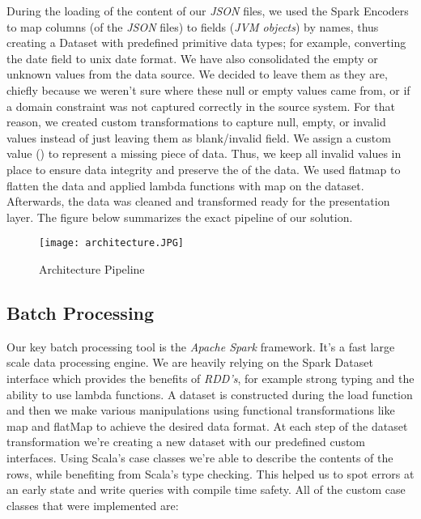 \documentclass[format=acmsmall, review=false, screen=true]{acmart}
\begin{document}
During the loading of the content of our \textit{JSON} files, we used the Spark Encoders to map columns (of the \textit{JSON} files) to fields (\textit{JVM objects}) by names, thus creating a Dataset with predefined primitive data types; for example, converting the date field to unix date format. We have also consolidated the empty or unknown values from the data source. We decided to leave them as they are, chiefly because we weren’t sure where these null or empty values came from, or if a domain constraint was not captured correctly in the source system. For that reason, we created custom transformations to capture null, empty, or invalid values instead of just leaving them as blank/invalid field. We assign a custom value () to represent a missing piece of data. Thus, we keep all invalid values in place to ensure data integrity and preserve the  of the data. We used flatmap to flatten the data and applied lambda functions with map on the dataset. Afterwards, the data was cleaned and transformed ready for the presentation layer. The figure below summarizes the exact pipeline of our solution.

\begin{figure}[H]
  \texttt{[image: architecture.JPG]}
  \caption{Architecture Pipeline}
  \label{fig:main-diagram}
\end{figure}

\subsection{Batch Processing}
Our key batch processing tool is the \textit{Apache Spark} framework. It’s a fast large scale data processing engine. We are heavily relying on the Spark Dataset interface which provides the benefits of \textit{RDD’s}, for example strong typing and the ability to use lambda functions. A dataset is constructed during the load function and then we make various manipulations using functional transformations like map and flatMap to achieve the desired data format. At each step of the dataset transformation we’re creating a new dataset with our predefined custom interfaces. Using Scala’s case classes we’re able to describe the contents of the rows, while benefiting from Scala’s type checking. This helped us to spot errors at an early state and write queries with compile time safety. All of the custom case classes that were implemented are:
\end{document}
